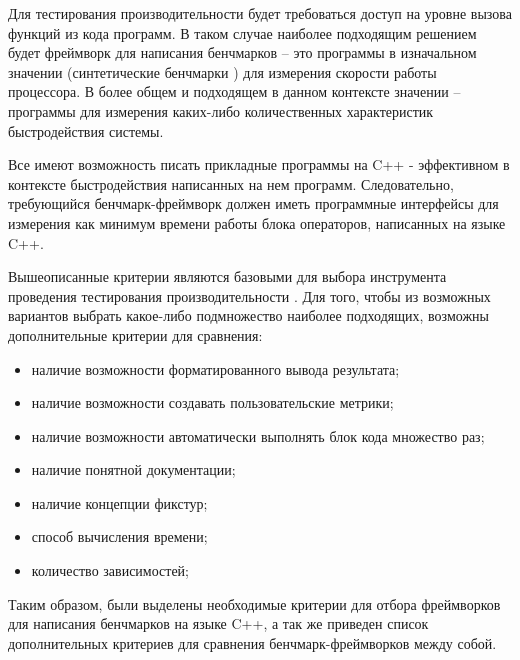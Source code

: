 Для тестирования производительности \marm{} будет требоваться доступ на уровне вызова функций из кода программ. В таком случае наиболее подходящим решением будет фреймворк для написания бенчмарков -- это программы в изначальном значении (синтетические бенчмарки \cite{curnow1976synthetic}) для измерения скорости работы процессора. В более общем и подходящем в данном контексте значении -- программы для измерения каких-либо количественных характеристик быстродействия системы.

Все \marm{} имеют возможность писать прикладные программы на C++ - эффективном в контексте быстродействия написанных на нем программ. Следовательно, требующийся бенчмарк-фреймворк должен иметь программные интерфейсы для измерения как минимум времени работы блока операторов, написанных на языке C++. 

Вышеописанные критерии являются базовыми для выбора инструмента проведения тестирования производительности \marm{}. Для того, чтобы из возможных вариантов выбрать какое-либо подмножество наиболее подходящих, возможны дополнительные критерии для сравнения:

\begin{itemize}[noitemsep]
	\item наличие возможности форматированного вывода результата;
	\item наличие возможности создавать пользовательские метрики;
	\item наличие возможности автоматически выполнять блок кода множество раз;
	\item наличие понятной документации;
	\item наличие концепции фикстур;
	\item способ вычисления времени;
	\item количество зависимостей;
\end{itemize}

Таким образом, были выделены необходимые критерии для отбора фреймворков для написания бенчмарков на языке C++, а так же приведен список дополнительных критериев для сравнения бенчмарк-фреймворков между собой.

